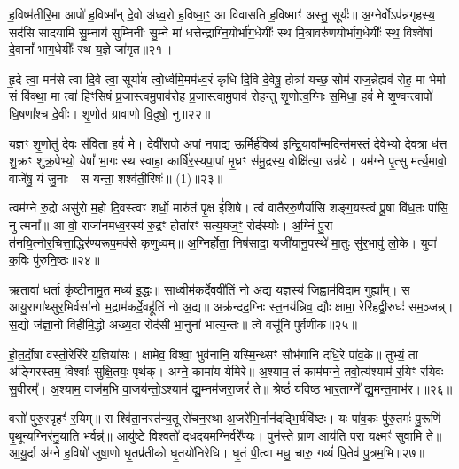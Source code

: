 {\anuvakamend[{अ॒सि॒ षड्विꣳ॑शतिश्च॥11॥}]}

ह॒विष्म॑तीरि॒मा आपो॑ ह॒विष्मा᳚न् दे॒वो अ॑ध्व॒रो ह॒विष्मा॒ꣳ॒ आ वि॑वासति ह॒विष्माꣳ॑ अस्तु॒ सूर्यः॑॥ अ॒ग्नेर्वो\-ऽप॑न्नगृहस्य॒ सद॑सि सादयामि सु॒म्नाय॑ सुम्निनीः सु॒म्ने मा॑ धत्तेन्द्राग्नि॒योर्भा॑ग॒धेयीः᳚ स्थ मि॒त्रावरु॑णयोर्भाग॒धेयीः᳚ स्थ॒ विश्वे॑षां दे॒वानां᳚ भाग॒धेयीः᳚ स्थ य॒ज्ञे जा॑गृत॥२१॥

{\anuvakamend[{ह॒विष्म॑ती॒श्चतु॑स्रिꣳशत्॥12॥}]}

हृ॒दे त्वा॒ मन॑से त्वा दि॒वे त्वा॒ सूर्या॑य त्वो॒र्ध्वमि॒मम॑ध्व॒रं कृ॑धि दि॒वि दे॒वेषु॒ होत्रा॑ यच्छ॒ सोम॑ राज॒न्नेह्यव॑ रोह॒ मा भेर्मा सं वि॑क्था॒ मा त्वा॑ हिꣳसिषं प्र॒जास्त्वमु॒पाव॑रोह प्र॒जास्त्वामु॒पाव॑ रोहन्तु शृ॒णोत्व॒ग्निः स॒मिधा॒ हवं॑ मे शृ॒ण्वन्त्वापो॑ धि॒षणा᳚श्च दे॒वीः। शृ॒णोत॑ ग्रावाणो वि॒दुषो॒ नु॥२२॥

य॒ज्ञꣳ शृ॒णोतु॑ दे॒वः स॑वि॒ता हवं॑ मे। देवी॑रापो अपां नपा॒द्य ऊ॒र्मिर्\mbox{}ह॑वि॒ष्य॑ इन्द्रि॒यावा᳚न्म॒दिन्त॑म॒स्तं दे॒वेभ्यो॑ देव॒त्रा ध॑त्त शु॒क्रꣳ शु॑क्र॒पेभ्यो॒ येषां᳚ भा॒गः स्थ स्वाहा॒ कार्\mbox{}षि॑र॒स्यपा॒पां मृ॒ध्रꣳ स॑मु॒द्रस्य॒ वोक्षि॑त्या॒ उन्न॑ये। यम॑ग्ने पृ॒त्सु मर्त्य॒मावो॒ वाजे॑षु॒ यं जु॒नाः। स यन्ता॒ शश्व॑ती॒रिषः॑॥ (1)॥२३॥

{\anuvakamend[{नु स॒प्तच॑त्वारिꣳशच्च॥13॥}]}

त्वम॑ग्ने रु॒द्रो असु॑रो म॒हो दि॒वस्त्वꣳ शर्धो॒ मारु॑तं पृ॒क्ष ई॑शिषे। त्वं वातै॑ररु॒णैर्या॑सि शङ्ग॒यस्त्वं पू॒षा वि॑ध॒तः पा॑सि॒ नु त्मना᳚॥ आ वो॒ राजा॑नमध्व॒रस्य॑ रु॒द्रꣳ होता॑रꣳ सत्य॒यज॒ꣳ॒ रोद॑स्योः। अ॒ग्निं पु॒रा त॑नयि॒त्नोर॒चित्ता॒द्धिर॑ण्यरूप॒मव॑से कृणुध्वम्॥ अ॒ग्निर्होता॒ निष॑सादा॒ यजी॑यानु॒पस्थे॑ मा॒तुः सु॑र॒भावु॑ लो॒के। युवा॑ क॒विः पु॑रुनि॒ष्ठः॥२४॥

ऋ॒तावा॑ ध॒र्ता कृ॑ष्टी॒नामु॒त मध्य॑ इ॒द्धः॥ सा॒ध्वीम॑कर्दे॒ववी॑तिं नो अ॒द्य य॒ज्ञस्य॑ जि॒ह्वाम॑विदाम॒ गुह्या᳚म्। स आयु॒रागा᳚थ्सुर॒भिर्वसा॑नो भ॒द्राम॑कर्दे॒वहू॑तिं नो अ॒द्य॥ अक्र॑न्दद॒ग्निः स्त॒नय॑न्निव॒ द्यौः क्षामा॒ रेरि॑हद्वी॒रुधः॑ सम॒ञ्जन्न्। स॒द्यो ज॑ज्ञा॒नो विहीमि॒द्धो अख्य॒दा रोद॑सी भा॒नुना॑ भात्य॒न्तः॥ त्वे वसू॑नि पुर्वणीक॥२५॥

हो॒त॒र्दो॒षा वस्तो॒रेरि॑रे य॒ज्ञिया॑सः। क्षामे॑व॒ विश्वा॒ भुव॑नानि॒ यस्मि॒न्थ्सꣳ सौभ॑गानि दधि॒रे पा॑व॒के॥ तुभ्यं॒ ता अ॑ङ्गिरस्तम॒ विश्वाः᳚ सुक्षि॒तयः॒ पृथ॑क्। अग्ने॒ कामा॑य येमिरे॥ अ॒श्याम॒ तं काम॑मग्ने॒ तवो॒त्य॑श्याम॑ र॒यिꣳ र॑यिवः सु॒वीरम्᳚। अ॒श्याम॒ वाज॑म॒भि वा॒जय॑न्तो॒\-ऽश्याम॑ द्यु॒म्नम॑जरा॒जरं॑ ते॥ श्रेष्ठं॑ यविष्ठ भार॒ताग्ने᳚ द्यु॒मन्त॒माभ॑र।॥२६॥

वसो॑ पुरु॒स्पृहꣳ॑ र॒यिम्॥ स श्वि॑ता॒नस्त॑न्य॒तू रो॑चन॒स्था अ॒जरे॑भि॒र्नान॑दद्भि॒र्यवि॑ष्ठः। यः पा॑व॒कः पु॑रु॒तमः॑ पु॒रूणि॑ पृ॒थून्य॒ग्निर॑नु॒याति॒ भर्वन्न्॑॥ आयु॑ष्टे वि॒श्वतो॑ दधद॒यम॒ग्निर्वरे᳚ण्यः। पुन॑स्ते प्रा॒ण आय॑ति॒ परा॒ यक्ष्मꣳ॑ सुवामि ते॥ आ॒यु॒र्दा अ॑ग्ने ह॒विषो॑ जुषा॒णो घृ॒तप्र॑तीको घृ॒तयो॑निरेधि। घृ॒तं पी॒त्वा मधु॒ चारु॒ गव्यं॑ पि॒तेव॑ पु॒त्रम॒भि॥२७॥

